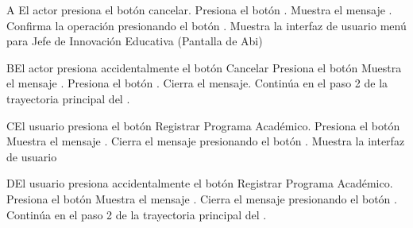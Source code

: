 

\begin{UCtrayectoriaA}{A}{ El actor presiona el botón cancelar.}
	\UCpaso[\UCactor] Presiona el botón .
    \UCpaso Muestra el mensaje .
    \UCpaso[\UCactor] Confirma la operación presionando el botón .
    \UCpaso Muestra la interfaz de usuario menú para Jefe de Innovación Educativa (Pantalla de Abi)
\end{UCtrayectoriaA}



\begin{UCtrayectoriaA}{B}{El actor presiona accidentalmente el botón Cancelar}
	\UCpaso[\UCactor] Presiona el botón 
    \UCpaso Muestra el mensaje .
    \UCpaso[\UCactor] Presiona el botón .
    \UCpaso Cierra el mensaje.
    \UCpaso Continúa en el paso 2 de la trayectoria principal del .
\end{UCtrayectoriaA}


\begin{UCtrayectoriaA}{C}{El usuario presiona el botón Registrar Programa Académico.}
	\UCpaso[\UCactor] Presiona el botón 
    \UCpaso Muestra el mensaje .
    \UCpaso[\UCactor] Cierra el mensaje presionando el botón .
\UCpaso Muestra la interfaz de usuario 
\end{UCtrayectoriaA}


\begin{UCtrayectoriaA}{D}{El usuario presiona accidentalmente el botón Registrar Programa Académico.}
	\UCpaso[\UCactor] Presiona el botón 
    \UCpaso Muestra el mensaje .
    \UCpaso[\UCactor] Cierra el mensaje presionando el botón .
    \UCpaso Continúa en el paso 2 de la trayectoria principal del .
\end{UCtrayectoriaA}

